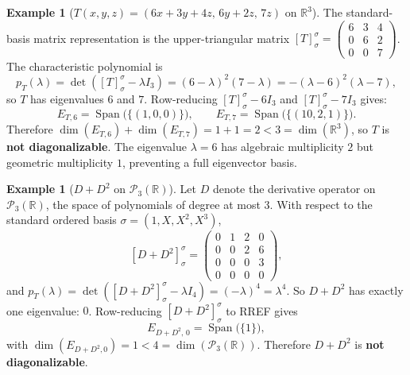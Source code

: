 \documentclass[11pt, a4paper, notitlepage]{report}
\theoremstyle{definition}
\newtheorem{example}[theorem]{Example}
\theoremstyle{remark}
\begin{document}
\begin{example}[$T(x,y,z) = (6x+3y+4z,\,6y+2z,\,7z)$ on $\mathbb{R}^3$]
\label{ex:diag-upper-triangular}
The standard-basis matrix representation is the upper-triangular matrix
$[T]_\sigma^\sigma = \begin{pmatrix} 6 & 3 & 4 \\ 0 & 6 & 2 \\ 0 & 0 & 7 \end{pmatrix}$.
The characteristic polynomial is
\[
  p_T(\lambda) = \det([T]_\sigma^\sigma - \lambda I_3)
  = (6-\lambda)^2(7-\lambda) = -(\lambda-6)^2(\lambda-7),
\]
so $T$ has eigenvalues $6$ and $7$. Row-reducing $[T]_\sigma^\sigma - 6I_3$ and
$[T]_\sigma^\sigma - 7I_3$ gives:
\[
  E_{T,6} = \operatorname{Span}\bigl(\{(1,0,0)\}\bigr), \qquad
  E_{T,7} = \operatorname{Span}\bigl(\{(10,2,1)\}\bigr).
\]
Therefore $\dim(E_{T,6}) + \dim(E_{T,7}) = 1 + 1 = 2 < 3 = \dim(\mathbb{R}^3)$, so $T$ is
\textbf{not diagonalizable}. The eigenvalue $\lambda = 6$ has algebraic multiplicity $2$ but
geometric multiplicity $1$, preventing a full eigenvector basis.
\end{example}

\begin{example}[$D + D^2$ on $\mathscr{P}_3(\mathbb{R})$]
\label{ex:diag-derivative}
Let $D$ denote the derivative operator on $\mathscr{P}_3(\mathbb{R})$, the space of polynomials of
degree at most $3$. With respect to the standard ordered basis $\sigma = (1, X, X^2, X^3)$,
\[
  [D + D^2]_\sigma^\sigma = \begin{pmatrix} 0&1&2&0\\ 0&0&2&6\\ 0&0&0&3\\ 0&0&0&0 \end{pmatrix},
\]
and $p_T(\lambda) = \det([D+D^2]_\sigma^\sigma - \lambda I_4) = (-\lambda)^4 = \lambda^4$.
So $D + D^2$ has exactly one eigenvalue: $0$. Row-reducing $[D+D^2]_\sigma^\sigma$ to RREF gives
\[
  E_{D+D^2,\,0} = \operatorname{Span}\bigl(\{1\}\bigr),
\]
with $\dim(E_{D+D^2,0}) = 1 < 4 = \dim(\mathscr{P}_3(\mathbb{R}))$. Therefore $D + D^2$ is
\textbf{not diagonalizable}.
\end{example}
\end{document}
